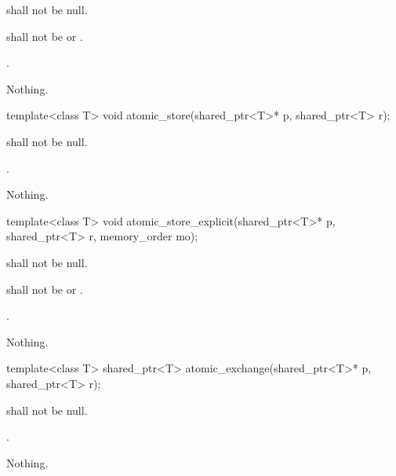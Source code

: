 \begin{itemdescr}
\pnum
\requires {} shall not be null.

\pnum
\requires {} shall not be  or .

\pnum
\returns {}.

\pnum
\throws Nothing.
\end{itemdescr}

%
%
\begin{itemdecl}
template<class T>
  void atomic_store(shared_ptr<T>* p, shared_ptr<T> r);
\end{itemdecl}

\begin{itemdescr}
\pnum
\requires {} shall not be null.

\pnum
\effects {}.

\pnum
\throws Nothing.
\end{itemdescr}

%
%
\begin{itemdecl}
template<class T>
  void atomic_store_explicit(shared_ptr<T>* p, shared_ptr<T> r, memory_order mo);
\end{itemdecl}

\begin{itemdescr}
\pnum
\requires {} shall not be null.

\pnum
\requires {} shall not be  or .

\pnum
\effects {}.

\pnum
\throws Nothing.
\end{itemdescr}

%
%
\begin{itemdecl}
template<class T>
  shared_ptr<T> atomic_exchange(shared_ptr<T>* p, shared_ptr<T> r);
\end{itemdecl}

\begin{itemdescr}
\pnum
\requires {} shall not be null.

\pnum
\returns {}.

\pnum
\throws Nothing.
\end{itemdescr}

